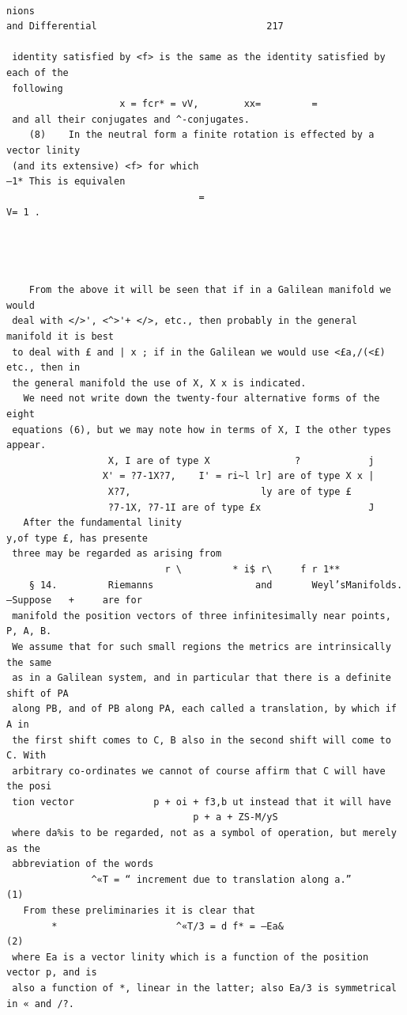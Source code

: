 \documentclass[10pt]{article}
\begin{document}
\begin{verbatim}

nions                                                                                                      and Differential                              217

 identity satisfied by <f> is the same as the identity satisfied by each of the
 following
                    x = fcr* = vV,        xx=         =
 and all their conjugates and ^-conjugates.
    (8)    In the neutral form a finite rotation is effected by a vector linity
 (and its extensive) <f> for which                                     —1* This is equivalen
                                  =                                           V= 1 .




    From the above it will be seen that if in a Galilean manifold we would
 deal with </>', <^>'+ </>, etc., then probably in the general manifold it is best
 to deal with £ and | x ; if in the Galilean we would use <£a,/(<£) etc., then in
 the general manifold the use of X, X x is indicated.
   We need not write down the twenty-four alternative forms of the eight
 equations (6), but we may note how in terms of X, I the other types appear.
                  X, I are of type X               ?            j
                 X' = ?7-1X?7,    I' = ri~l lr] are of type X x |
                  X?7,                       ly are of type £
                  ?7-1X, ?7-1I are of type £x                   J
   After the fundamental linity                                       y,of type £, has presente
 three may be regarded as arising from
                            r \         * i$ r\     f r 1**
    § 14.         Riemanns                  and       Weyl’sManifolds.—Suppose   +     are for
 manifold the position vectors of three infinitesimally near points, P, A, B.
 We assume that for such small regions the metrics are intrinsically the same
 as in a Galilean system, and in particular that there is a definite shift of PA
 along PB, and of PB along PA, each called a translation, by which if A in
 the first shift comes to C, B also in the second shift will come to C. With
 arbitrary co-ordinates we cannot of course affirm that C will have the posi­
 tion vector              p + oi + f3,b ut instead that it will have
                                 p + a + ZS-M/yS
 where da%is to be regarded, not as a symbol of operation, but merely as the
 abbreviation of the words
               ^«T = “ increment due to translation along a.”                  (1)
   From these preliminaries it is clear that
        *                     ^«T/3 = d f* = —Ea&                             (2)
 where Ea is a vector linity which is a function of the position vector p, and is
 also a function of *, linear in the latter; also Ea/3 is symmetrical in « and /?.


\end{verbatim}
\end{document}
